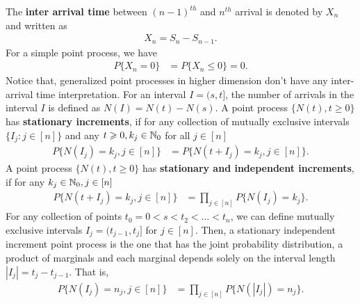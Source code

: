 \documentclass[a4paper,10pt,english]{article}
\begin{document}
The \textbf{inter arrival time} between $(n-1)^{th}$ and $n^{th}$ arrival is denoted by $X_n$ and written as
\begin{align*}
X_n = S_n - S_{n-1}.
\end{align*}
For a simple point process, we have
\begin{align*}
P\{X_{n} = 0\} &= P\{X_n\leqslant 0\} = 0.
\end{align*}
Notice that, generalized point processes in higher dimension don't have any inter-arrival time interpretation. 
For an interval $I = (s,t]$, the number of arrivals in the interval $I$ is defined as $N(I) = N(t) - N(s)$. 
A point process $\{N(t), t\geqslant 0\}$ has \textbf{stationary increments}, 
if for any collection of mutually exclusive intervals $\{I_j: j \in [n]\}$ and any $t \geqslant 0, k_j \in \mathbb{N}_0$ for all $j \in [n]$ 
\begin{align*}
P\{N(I_j) = k_j, j \in [n]\} &= P\{N(t + I_j) = k_j, j \in [n]\}.
\end{align*}
A point process $\{N(t), t\geqslant 0\}$ has \textbf{stationary  and independent increments}, if for any $k_j\in \mathbb{N}_0, j \in [n]$
\begin{align*}
P\{N(t+I_j) = k_j, j \in [n]\} &= \prod_{j \in [n]}P\{N(I_j) = k_j\}.
\end{align*}
For any collection of points  $t_0 = 0 < s<t_{2} < \ldots < t_{n}$, 
we can define mutually exclusive intervals $I_j = (t_{j-1}, t_j]$ for $j \in [n]$. 
Then, a stationary independent increment point process is the one that has the joint probability distribution, a product of marginals and each marginal depends solely on the interval length $|I_j| = t_j - t_{j-1}$. 
That is, 
\begin{align*}
P\{N(I_j) = n_j,{j \in [n]}\} &= \prod_{j \in [n]}P\{N(|I_j|) = n_j\}.
\end{align*} 
\end{document}
